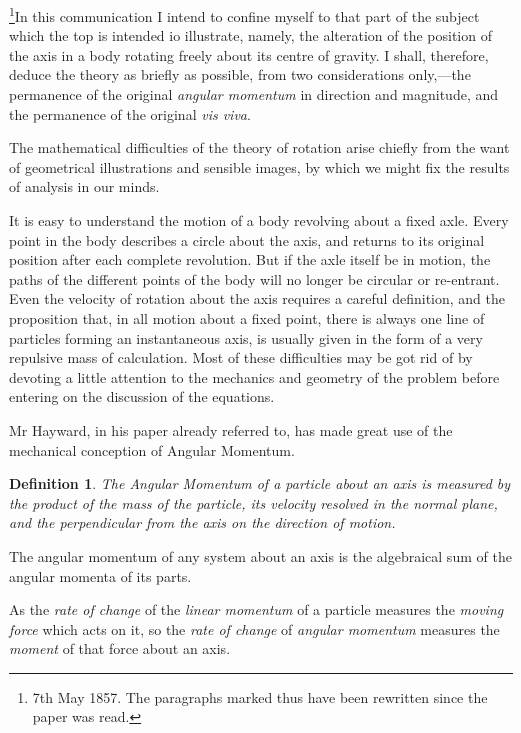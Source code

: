 \documentclass[12pt]{article}
\newtheorem{definition}{Definition}
\begin{document}
\footnote[1]{7th May 1857.  The paragraphs marked thus have been
rewritten since the paper was read.}In this communication I intend to
confine myself to that part of the subject which the top is intended
io illustrate, namely, the alteration of the position of the axis in a
body rotating freely about its centre of gravity.  I shall, therefore,
deduce the theory as briefly as possible, from two considerations
only,---the permanence of the original \emph{angular momentum} in
direction and magnitude, and the permanence of the original \emph{vis
viva}.

\footnotemark[1]The mathematical difficulties of the theory of
rotation arise chiefly from the want of geometrical illustrations and
sensible images, by which we might fix the results of analysis in our
minds.

It is easy to understand the motion of a body revolving about a fixed
axle.  Every point in the body describes a circle about the axis, and
returns to its original position after each complete revolution.  But
if the axle itself be in motion, the paths of the different points of
the body will no longer be circular or re-entrant.  Even the velocity
of rotation about the axis requires a careful definition, and the
proposition that, in all motion about a fixed point, there is always
one line of particles forming an instantaneous axis, is usually given
in the form of a very repulsive mass of calculation.  Most of these
difficulties may be got rid of by devoting a little attention to the
mechanics and geometry of the problem before entering on the
discussion of the equations.

Mr Hayward, in his paper already referred to, has made great use of
the mechanical conception of Angular Momentum.

\begin{definition}
The Angular Momentum of a particle about an axis is measured by the
product of the mass of the particle, its velocity resolved in the
normal plane, and the perpendicular from the axis on the direction of
motion.
\end{definition}

\footnotemark[1]The angular momentum of any system about an axis is
the algebraical sum of the angular momenta of its parts.

As the \emph{rate of change} of the \emph{linear momentum} of a
particle measures the \emph{moving force} which acts on it, so the
\emph{rate of change} of \emph{angular momentum} measures the
\emph{moment} of that force about an axis.
\end{document}
